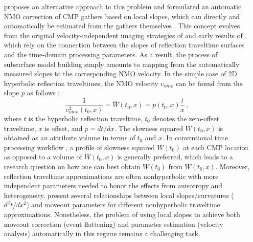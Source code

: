\cite{fomelslope} proposes an alternative approach to this problem and formulated an automatic NMO correction of CMP gathers based on local slopes, which can directly and automatically be estimated from the gathers themselves \cite[]{fomelpwd}. This concept evolves from the original velocity-independent imaging strategies of \cite{otto} and early results of \cite{wolf}, which rely on the connection between the slopes of reflection traveltime surfaces and the time-domain processing parameters. As a result, the process of subsurface model building simply amounts to mapping from the automatically measured slopes to the corresponding NMO velocity. 
In the simple case of 2D hyperbolic reflection traveltimes, the NMO velocity $v_{nmo}$ can be found from the slope $p$ as follows \cite[]{fomelslope}:
\begin{equation}
\label{eq:slopehyper}
    \frac{1}{v^2_{nmo} (t_0,x)} = \bar{W}(t_0,x) = p(t_0,x)\frac{t}{x}~,  
\end{equation}
where $t$ is the hyperbolic reflection traveltime, $t_0$ denotes the zero-offset traveltime, $x$ is offset, and $p = dt/dx$. The slowness squared $\bar{W}(t_0,x)$ is obtained as an attribute volume in terms of $t_0$ and $x$. In conventional time processing workflow \cite[]{yilmaz}, a profile of slowness squared $W(t_0)$ at each CMP location as opposed to a volume of $\bar{W}(t_0,x)$ is generally preferred, which leads to a research question on how one can best obtain $W(t_0)$ from $\bar{W}(t_0,x)$. Moreover, reflection traveltime approximations are often nonhyperbolic with more independent parameters needed to honor the effects from anisotropy and heterogeneity. \cite{mapping} present several relationships between local slopes/curvatures ($d^2t/dx^2$) and moveout parameters for different nonhyperbolic traveltime approximations. Nonetheless, the problem of using local slopes to achieve both moveout correction (event flattening) and parameter estimation (velocity analysis) automatically in this regime remains a challenging task. 



